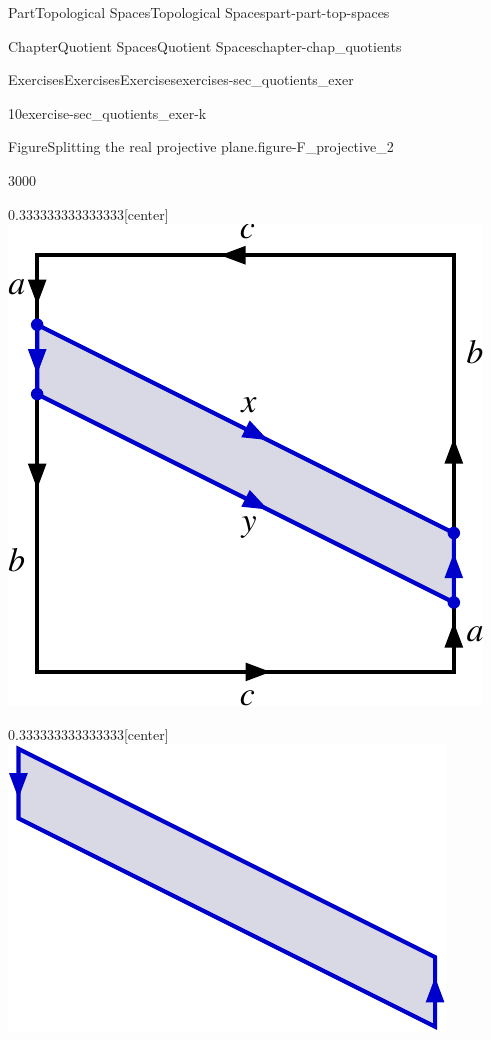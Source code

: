 \documentclass[oneside,10pt,]{book}
\numberwithin{equation}{chapter}
\begin{document}
\begin{partptx}{Part}{Topological Spaces}{}{Topological Spaces}{}{}{part-part-top-spaces}
\begin{chapterptx}{Chapter}{Quotient Spaces}{}{Quotient Spaces}{}{}{chapter-chap_quotients}
\begin{exercises-section}{Exercises}{Exercises}{}{Exercises}{}{}{exercises-sec_quotients_exer}
\begin{divisionexercise}{10}{}{}{exercise-sec_quotients_exer-k}
\begin{enumerate}[font=\bfseries,label=(\alph*),ref=\alph*]
\begin{enumerate}[font=\bfseries,label=(\roman*),ref=\theenumi.\roman*]
\begin{figureptx}{Figure}{Splitting the real projective plane.}{figure-F_projective_2}{}
\begin{sidebyside}{3}{0}{0}{0}
\begin{sbspanel}{0.333333333333333}[center]
\includegraphics[width=\linewidth]{external/Projective_Mobius.pdf}
\end{sbspanel}%
\begin{sbspanel}{0.333333333333333}[center]%
\includegraphics[width=\linewidth]{external/Projective_Mobius_split.pdf}
\end{sbspanel}%
\end{sidebyside}%
\tcblower
\end{figureptx}%

\end{enumerate}
\end{enumerate}
\end{divisionexercise}
\end{exercises-section}
\end{chapterptx}
\end{partptx}
\end{document}
